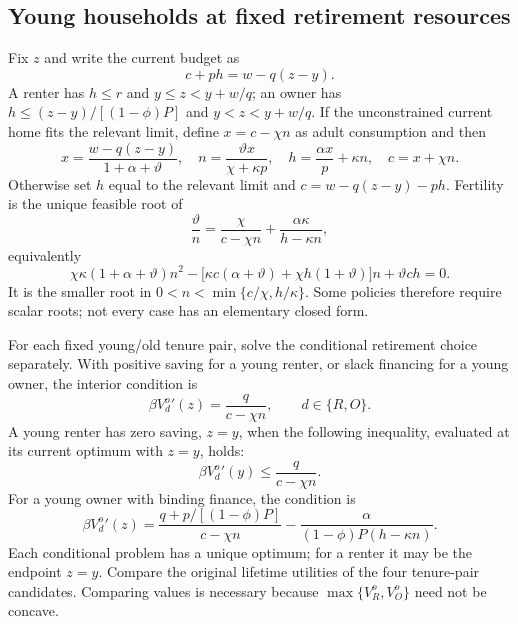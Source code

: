 \documentclass[11pt]{article}
\begin{document}
\subsection{Young households at fixed retirement resources}

Fix $z$ and write the current budget as
\begin{equation}
c+ph=w-q(z-y).
\end{equation}
A renter has $h\leq r$ and $y\leq z<y+w/q$; an owner has
$h\leq(z-y)/[(1-\phi)P]$ and $y<z<y+w/q$. If the unconstrained current home
fits the relevant limit, define $x=c-\chi n$ as adult consumption and
then
\begin{equation}
x=\frac{w-q(z-y)}{1+\alpha+\vartheta},\quad
n=\frac{\vartheta x}{\chi+\kappa p},\quad
h=\frac{\alpha x}{p}+\kappa n,\quad c=x+\chi n.
\end{equation}
Otherwise set $h$ equal to the relevant limit and
$c=w-q(z-y)-ph$. Fertility is the unique feasible root of
\begin{equation}
\frac{\vartheta}{n}=\frac{\chi}{c-\chi n}
 +\frac{\alpha\kappa}{h-\kappa n},
\end{equation}
equivalently
\begin{equation}
\chi\kappa(1+\alpha+\vartheta)n^2
 -\bigl[\kappa c(\alpha+\vartheta)+\chi h(1+\vartheta)\bigr]n
 +\vartheta ch=0.
\end{equation}
It is the smaller root in $0<n<\min\{c/\chi,h/\kappa\}$. Some policies
therefore require scalar roots; not every case has an elementary closed form.

For each fixed young/old tenure pair, solve the conditional retirement choice
separately. With positive saving for a young renter, or slack financing for a
young owner, the interior condition is
\begin{equation}
\beta {V_d^o}'(z)=\frac{q}{c-\chi n},\qquad d\in\{R,O\}.
\end{equation}
A young renter has zero saving, $z=y$, when the following inequality, evaluated
at its current optimum with $z=y$, holds:
\begin{equation}
\beta {V_d^o}'(y)\leq\frac{q}{c-\chi n}.
\end{equation}
For a young owner with binding finance, the condition is
\begin{equation}
\beta {V_d^o}'(z)=
\frac{q+p/[(1-\phi)P]}{c-\chi n}
 -\frac{\alpha}{(1-\phi)P(h-\kappa n)}.
\end{equation}
Each conditional problem has a unique optimum; for a renter it may be the
endpoint $z=y$. Compare the original lifetime utilities of the four
tenure-pair candidates. Comparing values is necessary because
$\max\{V_R^o,V_O^o\}$ need not be concave.
\end{document}
